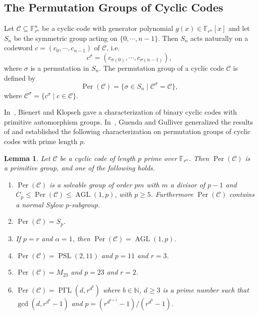 \documentclass[journal,12pt,onecolumn]{IEEEtran}
\newtheorem{lemma}{Lemma}
\begin{document}
\subsection{The Permutation Groups of Cyclic Codes}


Let $\mathcal{C}\subseteq \mathbb{F}_{r^\alpha}^n$ be a cyclic code with generator polynomial $g(x)\in\mathbb{F}_{r^\alpha}[x]$ and let $S_n$ be the symmetric group acting on $\{0,\cdots,n-1\}$. Then $S_n$ acts naturally on a codeword $c = (c_0,\cdots,c_{n-1})$ of $\mathcal{C}$, i.e.
\[
    c^\sigma = (c_{\sigma(0)},\cdots,c_{\sigma(n-1)}),
\]
where $\sigma$ is a permutation in $S_n$. The permutation group of a cyclic code $\mathcal{C}$ is defined by
\[
    \operatorname{Per}(\mathcal{C}) = \{ \sigma\in S_n\mid \mathcal{C}^\sigma = \mathcal{C} \}, 
\]
where $\mathcal{C}^\sigma = \{c^\sigma\mid c\in\mathcal{C}\}$. 

In~\cite{bienertAutomorphismGroupsCyclic2010}, Bienert and Klopsch gave a characterization of binary cyclic codes with primitive automorphism groups. In~\cite{guendaPermutationGroupsCyclic2013}, Guenda and Gulliver generalized the results of \cite{bienertAutomorphismGroupsCyclic2010} and established the following characterization on permutation groups of cyclic codes with prime length $p$. 


 
\begin{lemma}\label{per_cyc_p}\cite[Thm. 3]{guendaPermutationGroupsCyclic2013}
    Let $\mathcal{C}$ be a cyclic code of length $p$ prime over $\mathbb{F}_{r^\alpha}$. Then $\operatorname{Per}(\mathcal{C})$ is a primitive group, and one of the following holds.
    \begin{enumerate}
        \item $\operatorname{Per}(\mathcal{C})$ is a solvable group of order $pm$ with $m$ a divisor of $p-1$ and $C_p\le \operatorname{Per}(\mathcal{C}) \le \operatorname{AGL}(1,p)$, with $p\ge 5$. Furthermore $\operatorname{Per}(\mathcal{C})$ contains a normal Sylow $p$-subgroup.
        \item $\operatorname{Per}(\mathcal{C}) = S_p$.
        \item If $p = r$ and $\alpha = 1$, then $\operatorname{Per}(\mathcal{C}) = \operatorname{AGL}(1,p)$.
        \item $\operatorname{Per}(\mathcal{C}) = \operatorname{PSL}(2,11)$ and $p = 11$ and $r = 3$. 
        \item $\operatorname{Per}(\mathcal{C}) = M_{23}$ and $p = 23$ and $r = 2$. 
        \item $\operatorname{Per}(\mathcal{C}) = \operatorname{P\Gamma L}(d,r^{d^b})$ where $b\in\mathbb{N}$, $d\ge 3$ is a prime number such that $\gcd(d,r^{d^b}-1)$ and $p = (r^{d^{b+1}} - 1)/(r^{d^b} - 1)$.
    \end{enumerate}
\end{lemma}
 
\end{document}
